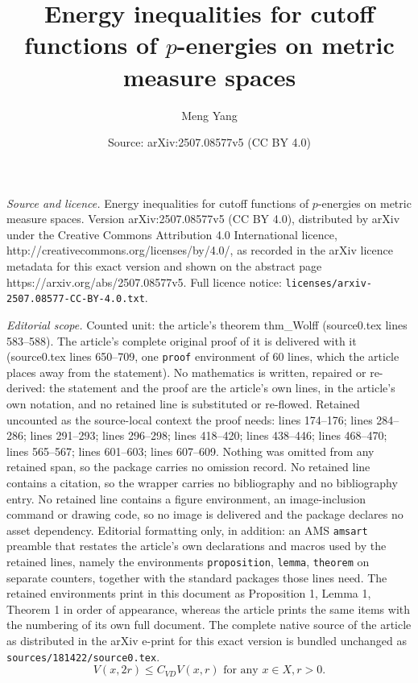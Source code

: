 \documentclass[10pt,a4paper]{amsart}
\title{\large{Energy inequalities for cutoff functions of $p$-energies on metric measure spaces}}
\author{Meng Yang}
\date{Source: arXiv:2507.08577v5 (CC BY 4.0)}
\begin{document}
\maketitle

\noindent\emph{Source and licence.} \large{Energy inequalities for cutoff functions of $p$-energies on metric measure spaces}. Version arXiv:2507.08577v5 (CC BY 4.0), distributed by arXiv under the Creative Commons Attribution 4.0 International licence, http://creativecommons.org/licenses/by/4.0/, as recorded in the arXiv licence metadata for this exact version and shown on the abstract page https://arxiv.org/abs/2507.08577v5. Full licence notice: \texttt{licenses/arxiv-2507.08577-CC-BY-4.0.txt}.\par\smallskip

\noindent\textit{Editorial scope.} Counted unit: the article's theorem thm\_Wolff (source0.tex lines 583--588). The article's complete original proof of it is delivered with it (source0.tex lines 650--709, one \texttt{proof} environment of 60 lines, which the article places away from the statement). No mathematics is written, repaired or re-derived: the statement and the proof are the article's own lines, in the article's own notation, and no retained line is substituted or re-flowed.  Retained uncounted as the source-local context the proof needs: lines 174--176; lines 284--286; lines 291--293; lines 296--298; lines 418--420; lines 438--446; lines 468--470; lines 565--567; lines 601--603; lines 607--609.  Nothing was omitted from any retained span, so the package carries no omission record.  No retained line contains a citation, so the wrapper carries no bibliography and no bibliography entry.  No retained line contains a figure environment, an image-inclusion command or drawing code, so no image is delivered and the package declares no asset dependency.  Editorial formatting only, in addition: an AMS \texttt{amsart} preamble that restates the article's own declarations and macros used by the retained lines, namely the environments \texttt{proposition}, \texttt{lemma}, \texttt{theorem} on separate counters, together with the standard packages those lines need.  The retained environments print in this document as Proposition 1, Lemma 1, Theorem 1 in order of appearance, whereas the article prints the same items with the numbering of its own full document.  The complete native source of the article as distributed in the arXiv e-print for this exact version is bundled unchanged as \texttt{sources/181422/source0.tex}.
\begin{equation*}\label{eq_VD}\tag*{VD}
V(x,2r)\le C_{VD}V(x,r)\text{ for any }x\in X,r>0.
\end{equation*}
\end{document}
